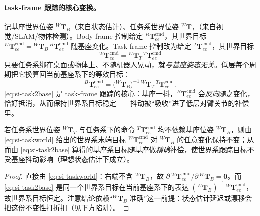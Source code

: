 \paragraph{task-frame 跟踪的核心变换。}
记基座世界位姿 ${}^{W}\mathbf{T}_{B}$（来自状态估计）、任务系世界位姿 ${}^{W}\mathbf{T}_{T}$（来自视觉/SLAM/物体检测）。Body-frame 控制给定 ${}^{B}\mathbf{T}_{ee}^{\mathrm{cmd}}$，其世界目标 ${}^{W}\mathbf{T}_{ee}^{\mathrm{cmd}}={}^{W}\mathbf{T}_{B}\,{}^{B}\mathbf{T}_{ee}^{\mathrm{cmd}}$ 随基座变化。Task-frame 控制改为给定 ${}^{T}\mathbf{T}_{ee}^{\mathrm{cmd}}$，其世界目标
\begin{equation}
  {}^{W}\mathbf{T}_{ee}^{\mathrm{cmd}}={}^{W}\mathbf{T}_{T}\,{}^{T}\mathbf{T}_{ee}^{\mathrm{cmd}}
  \label{eq:si-taskworld}
\end{equation}
只要任务系绑在桌面或物体上、不随机器人晃动，就\emph{与基座姿态无关}。低层每个周期把它换算回当前基座系下的等效目标：
\begin{equation}
  \boxed{\;{}^{B}\mathbf{T}_{ee}^{\mathrm{cmd}}=\big({}^{W}\mathbf{T}_{B}\big)^{-1}\,{}^{W}\mathbf{T}_{T}\,{}^{T}\mathbf{T}_{ee}^{\mathrm{cmd}}.\;}
  \label{eq:si-task2base}
\end{equation}
\cref{eq:si-task2base} 是 task-frame 跟踪的核心：基座一抖，${}^{B}\mathbf{T}_{ee}^{\mathrm{cmd}}$ 会\emph{反向}随之变化，恰好抵消，从而保持世界系目标稳定——抖动被“吸收”进了低层对臂关节的补偿里。

\begin{proposition}\label{prop:si-invariance}
若任务系世界位姿 ${}^{W}\mathbf{T}_{T}$ 与任务系下的命令 ${}^{T}\mathbf{T}_{ee}^{\mathrm{cmd}}$ 均不依赖基座位姿 ${}^{W}\mathbf{T}_{B}$，则由 \cref{eq:si-taskworld} 给出的世界系末端目标 ${}^{W}\mathbf{T}_{ee}^{\mathrm{cmd}}$ 对 ${}^{W}\mathbf{T}_{B}$ 的任意变化保持不变；从而由 \cref{eq:si-task2base} 算得的基座系目标随基座做\emph{精确}补偿，使世界系跟踪目标不受基座抖动影响（理想状态估计下成立）。
\end{proposition}
\begin{proof}
直接由 \cref{eq:si-taskworld}：右端不含 ${}^{W}\mathbf{T}_{B}$，故 $\partial\,{}^{W}\mathbf{T}_{ee}^{\mathrm{cmd}}/\partial\,{}^{W}\mathbf{T}_{B}=\mathbf 0$。而 \cref{eq:si-task2base} 是同一个世界系目标在当前基座系下的表达 $({}^{W}\mathbf{T}_{B})^{-1}\,{}^{W}\mathbf{T}_{ee}^{\mathrm{cmd}}$，故世界系目标恒定。注意结论依赖“${}^{W}\mathbf{T}_{B}$ 准确”这一前提：状态估计延迟或漂移会把这份不变性打折扣（见下方陷阱）。
\end{proof}

